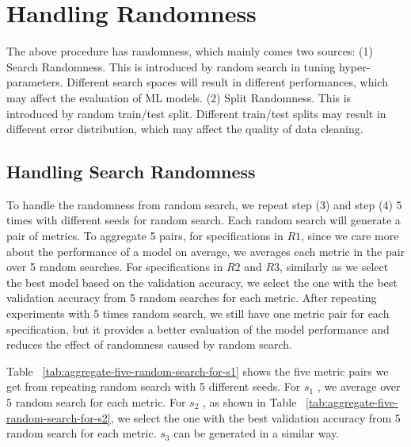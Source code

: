 \section{Handling Randomness}
The above procedure has randomness, which mainly comes two
sources: 
(1) Search Randomness. This is introduced by random
search in tuning hyper-parameters. Different search spaces will result in different performances, which may affect the evaluation of ML models. 
(2) Split Randomness. This is introduced by random train/test split. Different train/test splits may result in different error distribution, which may affect the quality of data cleaning.

\subsection{Handling Search Randomness}
To handle the randomness from random search, we repeat step
(3) and step (4) 5 times with different seeds for random search.
Each random search will generate a pair of metrics. To aggregate
5 pairs, for specifications in $R1$, 
since we care more about the performance of a model on average, we averages each metric in the pair over 5 random searches. For specifications in $R2$ and $R3$, similarly as we select the best model based on the validation accuracy,
we select the one with the best validation accuracy from 5 random
searches for each metric. After repeating experiments with 5 times
random search, we still have one metric pair for each specification,
but it provides a better evaluation of the model performance and
reduces the effect of randomness caused by random search.

\begin{example}
	Table ~\ref{tab:aggregate-five-random-search-for-s1} shows the five metric pairs we get from repeating random search with 5 different seeds. For $s_{1}$ , we average
	over 5 random search for each metric. For $s_{2}$ , as shown in Table ~\ref{tab:aggregate-five-random-search-for-s2},
	we select the one with the best validation accuracy from 5 random
	search for each metric. $s_{3}$ can be generated in a similar way.
\end{example}

